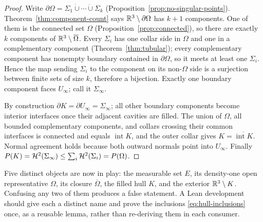 \begin{proof}
Write
$\partial\Omega=\Sigma_1\mathbin{\dot\cup}\cdots\mathbin{\dot\cup}\Sigma_k$
(Proposition~\ref{prop:no-singular-points}).
Theorem~\ref{thm:component-count} says $\mathbb R^3\setminus\partial\Omega$ has
$k+1$ components.  One of them is the connected set $\Omega$
(Proposition~\ref{prop:connected}), so there are exactly $k$ components of
$\mathbb R^3\setminus\overline\Omega$.  Every $\Sigma_i$ has one collar side in
$\Omega$ and one in a complementary component
(Theorem~\ref{thm:tubular}); every complementary component has nonempty
boundary contained in $\partial\Omega$, so it meets at least one $\Sigma_i$.
Hence the map sending $\Sigma_i$ to the component on its non-$\Omega$ side is
a surjection between finite sets of size $k$, therefore a bijection.  Exactly
one boundary component faces $U_\infty$; call it $\Sigma_\infty$.

By construction $\partial K=\partial U_\infty=\Sigma_\infty$; all other
boundary components become interior interfaces once their adjacent cavities are
filled.  The union of $\Omega$, all bounded complementary components, and
collars crossing their common interfaces is connected and equals
$\operatorname{int}K$, and the outer collar gives
$K=\overline{\operatorname{int}K}$.  Normal agreement holds because both
outward normals point into $U_\infty$.  Finally
$P(K)=\mathcal H^2(\Sigma_\infty)\le\sum_i\mathcal H^2(\Sigma_i)=P(\Omega)$.
\end{proof}

\begin{fnote}\label{fnote:bookkeeping}
Five distinct objects are now in play: the measurable set $E$, its density-one
open representative $\Omega$, its closure $\overline\Omega$, the filled hull
$K$, and the exterior $\mathbb R^3\setminus K$.  Confusing any two of them produces a
false statement.  A Lean development should give each a distinct name and
prove the inclusions \eqref{eq:hull-inclusions} once, as a reusable lemma,
rather than re-deriving them in each consumer.
\end{fnote}

